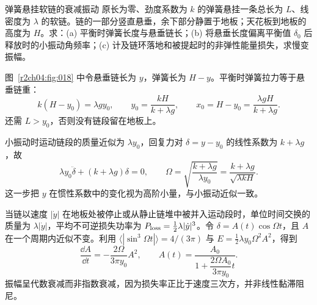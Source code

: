 \begin{practicebox}{弹簧悬挂软链的衰减振动}
原长为零、劲度系数为 $k$ 的弹簧悬挂一条总长为 $L$、线密度为 $\lambda$ 的软链。链的一部分竖直悬垂，余下部分静置于地板；天花板到地板的高度为 $H$。求：(a) 平衡时弹簧长度与悬垂链长；(b) 将悬垂长度偏离平衡值 $\delta_0$ 后释放时的小振动角频率；(c) 计及链环落地和被提起时的非弹性能量损失，求慢变振幅。
\label{r2ch04:pr:003}
\begin{solution}
图~\ref{r2ch04:fig:018} 中令悬垂链长为 $y$，弹簧长为 $H-y$。平衡时弹簧拉力等于悬垂链重：
\begin{equation}
 k(H-y_0)=\lambda gy_0,\qquad
 \boxed{y_0=\frac{kH}{k+\lambda g}},\qquad
 \boxed{x_0=H-y_0=\frac{\lambda gH}{k+\lambda g}}.
 \label{r2ch04:eq:043}
\end{equation}
还需 $L>y_0$，否则没有链段留在地板上。

小振动时运动链段的质量近似为 $\lambda y_0$，回复力对 $\delta=y-y_0$ 的线性系数为 $k+\lambda g$，故
\begin{equation}
 \lambda y_0\ddot\delta+(k+\lambda g)\delta=0,\qquad
 \boxed{\Omega=\sqrt{\frac{k+\lambda g}{\lambda y_0}}
 =\frac{k+\lambda g}{\sqrt{\lambda kH}}}.
 \label{r2ch04:eq:044}
\end{equation}
这一步把 $y$ 在惯性系数中的变化视为高阶小量，与小振动近似一致。

当链以速度 $|\dot y|$ 在地板处被停止或从静止链堆中被并入运动段时，单位时间交换的质量为 $\lambda|\dot y|$，平均不可逆损失功率为 $P_{\rm loss}=\tfrac12\lambda|\dot y|^3$。令 $\delta=A(t)\cos\Omega t$，且 $A$ 在一个周期内近似不变。利用
$\langle|\sin^3\Omega t|\rangle=4/(3\pi)$ 与
$E=\tfrac12\lambda y_0\Omega^2A^2$，得到
\begin{equation}
 \frac{\dd A}{\dd t}=-\frac{2\Omega}{3\pi y_0}A^2,\qquad
 \boxed{A(t)=\frac{A_0}{1+\dfrac{2\Omega A_0}{3\pi y_0}t}}.
 \label{r2ch04:eq:045}
\end{equation}
振幅呈代数衰减而非指数衰减，因为损失率正比于速度三次方，并非线性黏滞阻尼。
\figHangingChain
\end{solution}
\end{practicebox}

